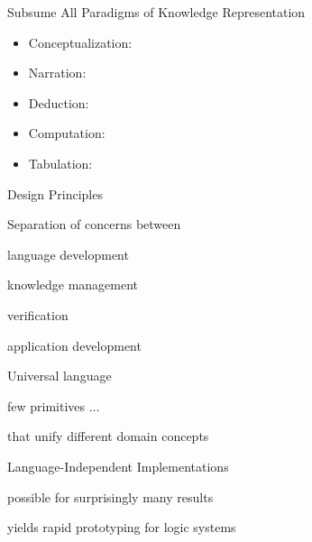 \documentclass{beamer}
\begin{document}
\begin{myframe}{Subsume All Paradigms of Knowledge Representation}
\begin{itemize}
\item Conceptualization: 
\item Narration:
\item Deduction:
\item Computation: 
\item Tabulation:
\end{itemize}

\vspace{-.5em}
\begin{center}
\end{center}
\end{myframe}

\begin{myframe}{Design Principles}
\begin{blockitems}{Separation of concerns between}
  \item language development
  \item knowledge management
  \item verification
  \item application development
\end{blockitems}

\begin{blockitems}{Universal language}
\item few primitives $\ldots$
\item that unify different domain concepts
\end{blockitems}

\begin{blockitems}{Language-Independent Implementations}
\item possible for surprisingly many results
\item yields rapid prototyping for logic systems
\end{blockitems}
\end{myframe}
\end{document}
